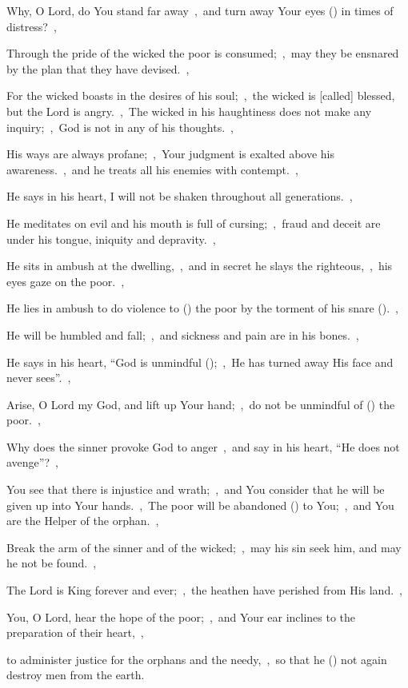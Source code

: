\documentclass[12pt,twoside,a5paper]{article}
\begin{document}

\begin{normalparskip}
  Why, O Lord, do You stand far away~\sep\ and turn away Your eyes () in times of distress?~\sep


  Through the pride of the wicked the poor is consumed;~\sep\ may they be ensnared by the plan that they have devised.~\sep

  For the wicked boasts in the desires of his soul;~\sep\ the wicked is [called] blessed, but the Lord is angry.~\sep\ The wicked in his haughtiness does not make any inquiry;~\sep\ God is not in any of his thoughts.~\sep

  His ways are always profane;~\sep\ Your judgment is exalted above his awareness.~\sep\ and he treats all his enemies with contempt.~\sep

  He says in his heart, I will not be shaken throughout all generations.~\sep

  He meditates on evil and his mouth is full of cursing;~\sep\ fraud and deceit are under his tongue, iniquity and depravity.~\sep

  He sits in ambush at the dwelling,~\sep\ and in secret he slays the righteous,~\sep\ his eyes gaze on the poor.~\sep

  He lies in ambush to do violence to () the poor by the torment of his snare ().~\sep

  He will be humbled and fall;~\sep\ and sickness and pain are in his bones.~\sep

  He says in his heart, ``God is unmindful ();~\sep\ He has turned away His face and never sees''.~\sep

  Arise, O Lord my God, and lift up Your hand;~\sep\ do not be unmindful of () the poor.~\sep

  Why does the sinner provoke God to anger~\sep\ and say in his heart, ``He does not avenge''?~\sep

  You see that there is injustice and wrath;~\sep\ and You consider that he will be given up into Your hands.~\sep\ The poor will be abandoned () to You;~\sep\ and You are the Helper of the orphan.~\sep

  Break the arm of the sinner and of the wicked;~\sep\ may his sin seek him, and may he not be found.~\sep

  The Lord is King forever and ever;~\sep\ the heathen have perished from His land.~\sep

  You, O Lord, hear the hope of the poor;~\sep\ and Your ear inclines to the preparation of their heart,~\sep

  to administer justice for the orphans and the needy,~\sep\ so that he () not again destroy men from the earth.
\end{normalparskip}
\end{document}

